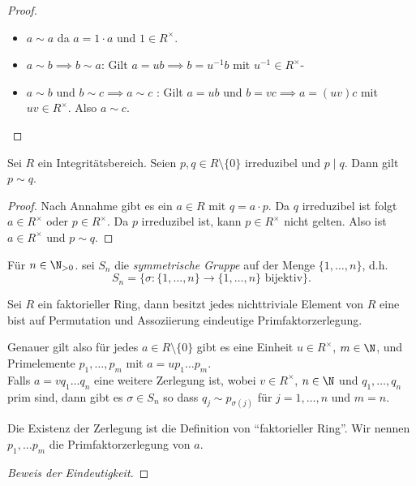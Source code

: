 \begin{proof}
	\begin{itemize}
		\item $a \sim a$ da $a = 1 \cdot a$ und $1 \in R^{\times}$.
		\item $a \sim b \implies b \sim a$: Gilt  $a = u b \implies b = u^{-1} b$ mit $u^{-1} \in R^{\times}$-
		\item $a \sim b$ und $b \sim c \implies a \sim c$ : Gilt $a = ub$ und $b = vc \implies a = (uv)c$ mit $uv \in R^{\times}$. Also $a \sim c$.
	\end{itemize}
\end{proof}

\begin{lemma}
	Sei $R$ ein Integritätsbereich. Seien $p,q \in R \setminus \{0\} $ irreduzibel und $p \mid q$.
	Dann gilt $p \sim q$.
\end{lemma}

\begin{proof}
	Nach Annahme gibt es ein $a \in R$ mit $q = a \cdot p$.
	Da $q$ irreduzibel ist folgt $a \in R^{\times}$ oder $p \in R^{\times}$.
	Da $p$ irreduzibel ist, kann $p \in R^{\times}$ nicht gelten.
	Also ist $a \in R^{\times}$ und $p \sim q$.
\end{proof}

\begin{definition}[Wh.]
	Für $n \in \N_{> 0}$. sei $S_{n}$ die \emph{symmetrische Gruppe} auf der Menge $\{1,\ldots,n\}$, d.h.
	\[
	S_{n} = \{ \sigma: \{1,\ldots, n\} \to \{1,\ldots,n\} \text{ bijektiv}\} 
	.\] 
\end{definition}

\begin{theorem}
	Sei $R$ ein faktorieller Ring, dann besitzt jedes nichttriviale Element von $R$ eine bist auf Permutation und Assoziierung 
	eindeutige Primfaktorzerlegung.

	Genauer gilt also für jedes $a \in R \setminus \{0\} $ gibt es eine Einheit $u \in R^{\times}$, $m \in \N$, und
	Primelemente $p_1,\ldots,p_{m}$ mit $a = u p_1 \ldots p_{m}$.\\
	Falls $a = v q_1 \ldots q_{n}$ eine weitere Zerlegung ist, wobei $v \in R^{\times}$, $n \in \N$ und $q_1,\ldots,q_{n}$ prim sind,
	dann gibt es $\sigma \in S_{n}$ so dass $q_{j} \sim p_{\sigma(j)}$ für $j = 1,\ldots,n$ und $m = n$.
\end{theorem}

	Die Existenz der Zerlegung ist die Definition von \enquote{faktorieller Ring}.
	Wir nennen $p_1,\ldots p_{m}$ die Primfaktorzerlegung von $a$.

\begin{proof}[Beweis der Eindeutigkeit]
	
\end{proof}



























